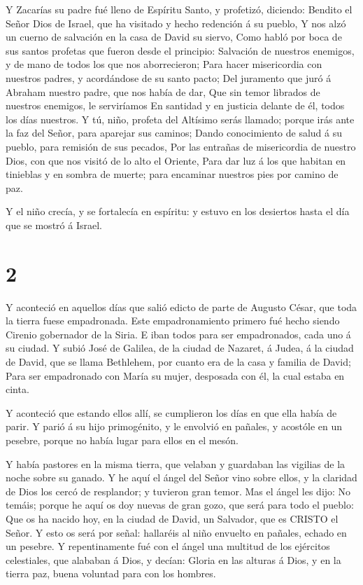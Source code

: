  Y Zacarías su padre fué lleno de Espíritu Santo, y
profetizó, diciendo:  Bendito el Señor Dios de Israel, que
ha visitado y hecho redención á su pueblo,  Y nos alzó un
cuerno de salvación en la casa de David su siervo,  Como
habló por boca de sus santos profetas que fueron desde el principio:
 Salvación de nuestros enemigos, y de mano de todos los que
nos aborrecieron;  Para hacer misericordia con nuestros
padres, y acordándose de su santo pacto;  Del juramento que
juró á Abraham nuestro padre, que nos había de dar,  Que
sin temor librados de nuestros enemigos, le serviríamos  En
santidad y en justicia delante de él, todos los días nuestros.
 Y tú, niño, profeta del Altísimo serás llamado; porque
irás ante la faz del Señor, para aparejar sus caminos; 
Dando conocimiento de salud á su pueblo, para remisión de sus pecados,
 Por las entrañas de misericordia de nuestro Dios, con que
nos visitó de lo alto el Oriente,  Para dar luz á los que
habitan en tinieblas y en sombra de muerte; para encaminar nuestros pies
por camino de paz.

 Y el niño crecía, y se fortalecía en espíritu: y estuvo en
los desiertos hasta el día que se mostró á Israel.

\hypertarget{section-1}{%
\section{2}\label{section-1}}

 Y aconteció en aquellos días que salió edicto de parte de
Augusto César, que toda la tierra fuese empadronada.  Este
empadronamiento primero fué hecho siendo Cirenio gobernador de la Siria.
 E iban todos para ser empadronados, cada uno á su ciudad.
 Y subió José de Galilea, de la ciudad de Nazaret, á Judea,
á la ciudad de David, que se llama Bethlehem, por cuanto era de la casa
y familia de David;  Para ser empadronado con María su
mujer, desposada con él, la cual estaba en cinta.

 Y aconteció que estando ellos allí, se cumplieron los días
en que ella había de parir.  Y parió á su hijo primogénito,
y le envolvió en pañales, y acostóle en un pesebre, porque no había
lugar para ellos en el mesón.

 Y había pastores en la misma tierra, que velaban y
guardaban las vigilias de la noche sobre su ganado.  Y he
aquí el ángel del Señor vino sobre ellos, y la claridad de Dios los
cercó de resplandor; y tuvieron gran temor.  Mas el ángel
les dijo: No temáis; porque he aquí os doy nuevas de gran gozo, que será
para todo el pueblo:  Que os ha nacido hoy, en la ciudad de
David, un Salvador, que es CRISTO el Señor.  Y esto os será
por señal: hallaréis al niño envuelto en pañales, echado en un pesebre.
 Y repentinamente fué con el ángel una multitud de los
ejércitos celestiales, que alababan á Dios, y decían: 
Gloria en las alturas á Dios, y en la tierra paz, buena voluntad para
con los hombres.

